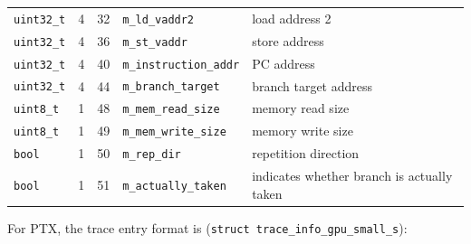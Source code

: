 \begin{footnotesize}
\begin{tabular}{l c c l l}
\Verb+uint32_t+ & 4            & 32             & \Verb+m_ld_vaddr2+        & load address 2                                         \\
\Verb+uint32_t+ & 4            & 36             & \Verb+m_st_vaddr+         & store address                                          \\
\Verb+uint32_t+ & 4            & 40             & \Verb+m_instruction_addr+ & PC address                                             \\
\Verb+uint32_t+ & 4            & 44             & \Verb+m_branch_target+    & branch target address                                  \\
\Verb+uint8_t+  & 1            & 48             & \Verb+m_mem_read_size+    & memory read size                                       \\ 
\Verb+uint8_t+  & 1            & 49             & \Verb+m_mem_write_size+   & memory write size                                      \\
\Verb+bool+     & 1            & 50             & \Verb+m_rep_dir+          & repetition direction                                   \\
\Verb+bool+     & 1            & 51             & \Verb+m_actually_taken+   & indicates whether branch is actually taken             \\
\end{tabular}
\end{footnotesize}
\vspace{0.2in}

For PTX, the trace entry format is (\Verb+struct trace_info_gpu_small_s+):

